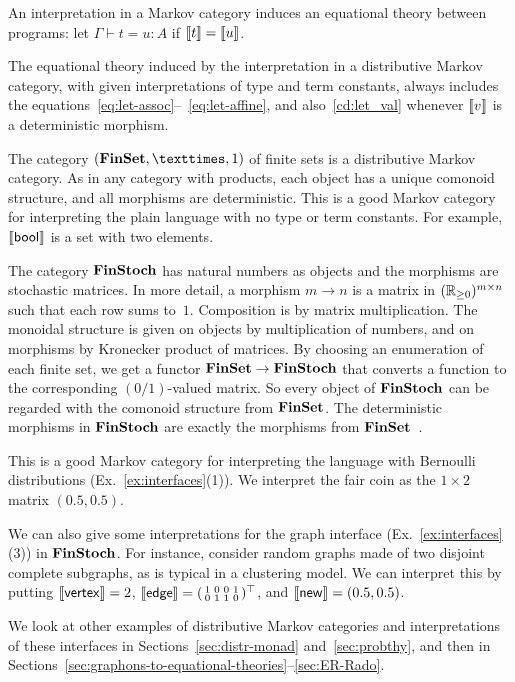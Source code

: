 An interpretation in a Markov category induces an equational theory
between programs: let $\Gamma\vdash t=u :A$ if $\llbracket t\rrbracket=\llbracket u\rrbracket$.
\begin{proposition}
The equational theory induced by the interpretation in a distributive Markov
category, with given interpretations of type and term constants,
always includes the
equations~\eqref{eq:let-assoc}--~\eqref{eq:let-affine}, 
and also~\eqref{cd:let_val} whenever $\llbracket v\rrbracket$ is a deterministic morphism. 
\end{proposition}
\begin{example}\label{ex:finset}
  The category $(\FinSet, ×, 1)$ of finite sets is a distributive Markov
    category. As in any category with products, each object has a
    unique comonoid structure, and all morphisms are deterministic. 
    This is a good Markov category for interpreting the plain language
    with no type or term constants. For example, $\llbracket \mathsf{bool}\rrbracket$ is a
    set with two elements. 
  \end{example}\begin{example}\label{ex:finstoch} The category $\mathbf{FinStoch}$ has natural numbers as objects and
    the morphisms are stochastic matrices. In more detail, a morphism $m\to
    n$ is a matrix in $(\mathbb{R}_{\geq 0})^{m\times n}$ such that each row sums
    to~$1$.
    Composition is by matrix multiplication. The monoidal structure is
    given on objects by multiplication of numbers, and on morphisms by
    Kronecker product of matrices.
    By choosing an enumeration of each finite set, we get a functor $\mathbf{FinSet}\to\mathbf{FinStoch}$ that converts a function to the corresponding
    $(0/1)$-valued matrix. So every object of $\mathbf{FinStoch}$ can be
    regarded with the comonoid structure from $\mathbf{FinSet}$. 
    The deterministic morphisms in
    $\mathbf{FinStoch}$ are exactly the morphisms from $\mathbf{FinSet}$~\cite[10.3]{fritz}. 

    This is a good Markov category for interpreting the language with
    Bernoulli distributions (Ex.~\ref{ex:interfaces}(1)). We
    interpret the fair coin as the $1\times 2$ matrix $(0.5,0.5)$.

    We can also give some interpretations for the graph interface (Ex.~\ref{ex:interfaces}(3)) in $\mathbf{FinStoch}$.
    For instance, consider random graphs made of two disjoint complete subgraphs,
    as is typical in a clustering model.
    We can interpret this by putting $\llbracket \mathsf{vertex}\rrbracket =2$,
    $\llbracket \mathsf{edge}\rrbracket=(\begin{smallmatrix}1&0&0&1
      \\0&1&1&0\end{smallmatrix})^\top$, and $\llbracket \mathsf{new}\rrbracket=(0.5,0.5)$.
\end{example}
We look at other examples of distributive Markov categories and
interpretations of these interfaces in
Sections~\ref{sec:distr-monad} and~\ref{sec:probthy}, and then in Sections~\ref{sec:graphons-to-equational-theories}--\ref{sec:ER-Rado}. 


